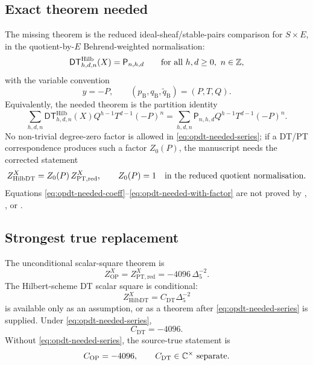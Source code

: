 \subsection{Exact theorem needed}

The missing theorem is the reduced ideal-sheaf/stable-pairs comparison
for \(S\times E\), in the quotient-by-\(E\) Behrend-weighted
normalisation:
\begin{equation}
\label{eq:opdt-needed-coeff}
\mathsf{DT}^{\mathrm{Hilb}}_{h,d,n}(X)
=
\mathsf P_{n,h,d}
\qquad
\hbox{for all }h,d\geq0,\ n\in\mathbb Z,
\end{equation}
with the variable convention
\begin{equation}
\label{eq:opdt-needed-vars}
y=-P,\qquad
(p_{\mathrm B},q_{\mathrm B},\widetilde q_{\mathrm B})
=(P,T,Q).
\end{equation}
Equivalently, the needed theorem is the partition identity
\begin{equation}
\label{eq:opdt-needed-series}
\sum_{h,d,n}
\mathsf{DT}^{\mathrm{Hilb}}_{h,d,n}(X)
Q^{h-1}T^{d-1}(-P)^n
=
\sum_{h,d,n}
\mathsf P_{n,h,d}Q^{h-1}T^{d-1}(-P)^n.
\end{equation}
No non-trivial degree-zero factor is allowed in
\eqref{eq:opdt-needed-series}; if a DT/PT correspondence produces such
a factor \(Z_0(P)\), the manuscript needs the corrected statement
\begin{equation}
\label{eq:opdt-needed-with-factor}
Z^{X}_{\mathrm{HilbDT}}
=
Z_0(P)\,Z^X_{\mathrm{PT,red}},
\qquad
Z_0(P)=1
\quad\hbox{in the reduced quotient normalisation}.
\end{equation}
Equations \eqref{eq:opdt-needed-coeff}--\eqref{eq:opdt-needed-with-factor}
are not proved by \cite{OB}, \cite{OPand}, or \cite{BRYAN}.

\subsection{Strongest true replacement}

The unconditional scalar-square theorem is
\begin{equation}
\label{eq:opdt-true-replacement-op}
Z^X_{\mathrm{OP}}
=Z^X_{\mathrm{PT,red}}
=-4096\,\Delta_5^{-2}.
\end{equation}
The Hilbert-scheme DT scalar square is conditional:
\begin{equation}
\label{eq:opdt-true-replacement-dt}
Z^X_{\mathrm{HilbDT}}
=C_{\mathrm{DT}}\Delta_5^{-2}
\end{equation}
is available only as an assumption, or as a theorem after
\eqref{eq:opdt-needed-series} is supplied.  Under
\eqref{eq:opdt-needed-series},
\begin{equation}
\label{eq:opdt-cdt-under-needed-theorem}
C_{\mathrm{DT}}=-4096.
\end{equation}
Without \eqref{eq:opdt-needed-series}, the source-true statement is
\begin{equation}
\label{eq:opdt-final-status}
C_{\mathrm{OP}}=-4096,
\qquad
C_{\mathrm{DT}}\in\mathbb C^\times\ {\rm separate}.
\end{equation}

